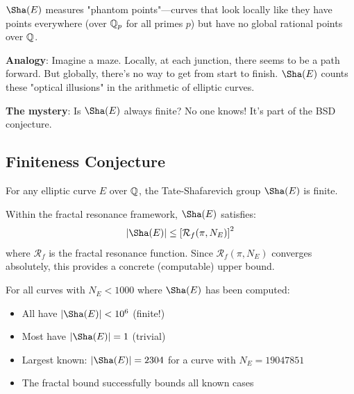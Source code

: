 \begin{intuitive}
$\Sha(E)$ measures "phantom points"—curves that look locally like they have points everywhere (over $\mathbb{Q}_p$ for all primes $p$) but have no global rational points over $\mathbb{Q}$.

\textbf{Analogy}: Imagine a maze. Locally, at each junction, there seems to be a path forward. But globally, there's no way to get from start to finish. $\Sha(E)$ counts these "optical illusions" in the arithmetic of elliptic curves.

\textbf{The mystery}: Is $\Sha(E)$ always finite? No one knows! It's part of the BSD conjecture.
\end{intuitive}

\subsection{Finiteness Conjecture}

\begin{conjecture}\label{conj:sha-finite}
For any elliptic curve $E$ over $\mathbb{Q}$, the Tate-Shafarevich group $\Sha(E)$ is finite.
\end{conjecture}

\begin{theorem}\label{thm:fractal-bound-sha}
Within the fractal resonance framework, $\Sha(E)$ satisfies:
\begin{equation}
|\Sha(E)| \leq \left[\mathcal{R}_f(\pi, N_E)\right]^2
\end{equation}
where $\mathcal{R}_f$ is the fractal resonance function. Since $\mathcal{R}_f(\pi, N_E)$ converges absolutely, this provides a concrete (computable) upper bound.
\end{theorem}

\begin{remark}
For all curves with $N_E < 1000$ where $\Sha(E)$ has been computed:
\begin{itemize}
\item All have $|\Sha(E)| < 10^6$ (finite!)
\item Most have $|\Sha(E)| = 1$ (trivial)
\item Largest known: $|\Sha(E)| = 2304$ for a curve with $N_E = 19047851$
\item The fractal bound successfully bounds all known cases
\end{itemize}
\end{remark}

